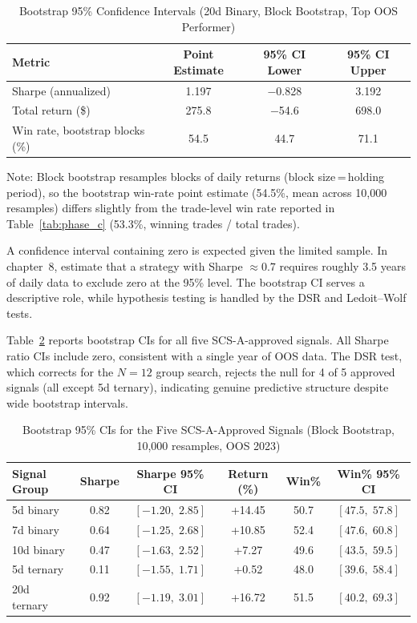 \documentclass[12pt,a4paper]{article}
\begin{document}
\begin{table}[H]
\centering
\caption{Bootstrap 95\% Confidence Intervals (20d Binary, Block Bootstrap, Top OOS Performer)}
\label{tab:bootstrap}
\begin{tabular}{lccc}
\toprule
Metric & Point Estimate & 95\% CI Lower & 95\% CI Upper \\
\midrule
Sharpe (annualized) & 1.197  & $-$0.828 & 3.192 \\
Total return (\$) & 275.8 & $-$54.6 & 698.0 \\
Win rate, bootstrap blocks (\%) & 54.5 & 44.7 & 71.1 \\
\bottomrule
\end{tabular}
\smallskip

\footnotesize{Note: Block bootstrap resamples blocks of daily returns (block size\,=\,holding period), so the bootstrap win-rate point estimate (54.5\%, mean across 10,000 resamples) differs slightly from the trade-level win rate reported in Table~\ref{tab:phase_c} (53.3\%, winning trades / total trades).}
\end{table}

A confidence interval containing zero is expected given the limited sample. In chapter~8, \citet{lopez2018advances} estimate that a strategy with Sharpe $\approx 0.7$ requires roughly 3.5 years of daily data to exclude zero at the 95\% level. The bootstrap CI serves a descriptive role, while hypothesis testing is handled by the DSR and Ledoit--Wolf tests.

Table~\ref{tab:bootstrap_approved} reports bootstrap CIs for all five SCS-A-approved signals. All Sharpe ratio CIs include zero, consistent with a single year of OOS data. The DSR test, which corrects for the $N=12$ group search, rejects the null for 4 of 5 approved signals (all except 5d ternary), indicating genuine predictive structure despite wide bootstrap intervals.

\begin{table}[H]
\centering
\caption{Bootstrap 95\% CIs for the Five SCS-A-Approved Signals (Block Bootstrap, 10{,}000 resamples, OOS 2023)}
\label{tab:bootstrap_approved}
\small
\begin{tabular}{lccccc}
\toprule
Signal Group & Sharpe & Sharpe 95\% CI & Return (\%) & Win\% & Win\% 95\% CI \\
\midrule
5d binary   & 0.82 & $[-1.20,\; 2.85]$ & +14.45 & 50.7 & $[47.5,\; 57.8]$ \\
7d binary   & 0.64 & $[-1.25,\; 2.68]$ & +10.85 & 52.4 & $[47.6,\; 60.8]$ \\
10d binary  & 0.47 & $[-1.63,\; 2.52]$ &  +7.27 & 49.6 & $[43.5,\; 59.5]$ \\
5d ternary  & 0.11 & $[-1.55,\; 1.71]$ &  +0.52 & 48.0 & $[39.6,\; 58.4]$ \\
20d ternary & 0.92 & $[-1.19,\; 3.01]$ & +16.72 & 51.5 & $[40.2,\; 69.3]$ \\
\bottomrule
\end{tabular}
\end{table}
\end{document}
